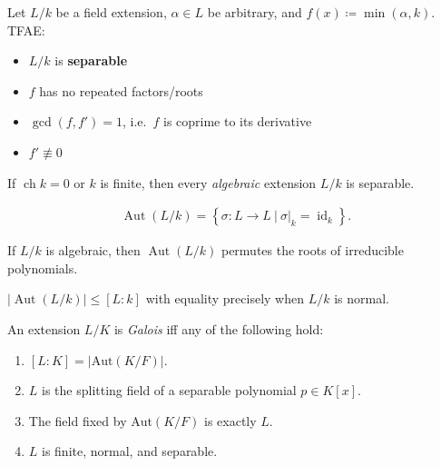 \begin{definition}

Let \(L/k\) be a field extension, \(\alpha \in L\) be arbitrary, and
\(f(x) \coloneqq\min(\alpha, k)\). TFAE:

\begin{itemize}
\tightlist
\item
  \(L/k\) is \textbf{separable}
\item
  \(f\) has no repeated factors/roots
\item
  \(\gcd(f, f') = 1\), i.e.~\(f\) is coprime to its derivative
\item
  \(f' \not\equiv 0\)
\end{itemize}

\end{definition}

\begin{proposition}

If \(\operatorname{ch}k = 0\) or \(k\) is finite, then every
\emph{algebraic} extension \(L/k\) is separable.

\end{proposition}

\begin{definition}

\begin{align*} 
{\operatorname{Aut}}(L/k) = \left\{{\sigma: L \to L {~\mathrel{\Big|}~} {\left.{{\sigma}} \right|_{{k}} }  = \operatorname{id}_k}\right\}
.\end{align*}

\end{definition}

\begin{proposition}

If \(L/k\) is algebraic, then \({\operatorname{Aut}}(L/k)\) permutes the
roots of irreducible polynomials.

\end{proposition}

\begin{proposition}

\({\left\lvert {\operatorname{Aut}(L/k)} \right\rvert} \leq [L: k]\)
with equality precisely when \(L/k\) is normal.

\end{proposition}

\begin{definition}

An extension \(L/K\) is \emph{Galois} iff any of the following hold:

\begin{enumerate}
\def\labelenumi{\arabic{enumi}.}
\tightlist
\item
  \([L: K] = {\left\lvert {\mathrm{Aut}(K/F)} \right\rvert}\).
\item
  \(L\) is the splitting field of a separable polynomial \(p\in K[x]\).
\item
  The field fixed by \(\mathrm{Aut}(K/F)\) is exactly \(L\).
\item
  \(L\) is finite, normal, and separable.
\end{enumerate}

\end{definition}

